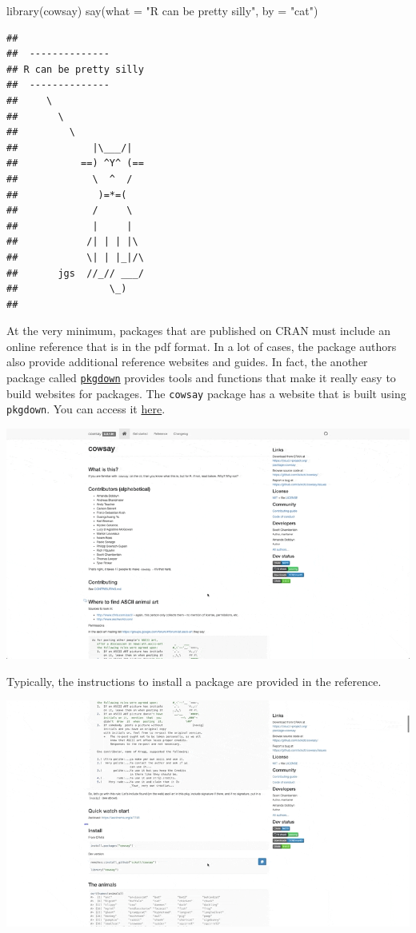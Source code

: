 \documentclass[
]{book}
\newenvironment{Shaded}{\begin{snugshade}}{\end{snugshade}}
\newcommand{\AttributeTok}[1]{\textcolor[rgb]{0.77,0.63,0.00}{#1}}
\newcommand{\FunctionTok}[1]{\textcolor[rgb]{0.00,0.00,0.00}{#1}}
\newcommand{\NormalTok}[1]{#1}
\newcommand{\StringTok}[1]{\textcolor[rgb]{0.31,0.60,0.02}{#1}}
\begin{document}
\begin{Shaded}
\begin{Highlighting}[]
\FunctionTok{library}\NormalTok{(cowsay)}
\FunctionTok{say}\NormalTok{(}\AttributeTok{what =} \StringTok{"R can be pretty silly"}\NormalTok{, }\AttributeTok{by =} \StringTok{"cat"}\NormalTok{)}
\end{Highlighting}
\end{Shaded}

\begin{verbatim}
## 
##  -------------- 
## R can be pretty silly 
##  --------------
##     \
##       \
##         \
##             |\___/|
##           ==) ^Y^ (==
##             \  ^  /
##              )=*=(
##             /     \
##             |     |
##            /| | | |\
##            \| | |_|/\
##       jgs  //_// ___/
##                \_)
## 
\end{verbatim}

At the very minimum, packages that are published on CRAN must include an online reference that is in the pdf format. In a lot of cases, the package authors also provide additional reference websites and guides. In fact, the another package called \href{https://pkgdown.r-lib.org/}{\texttt{pkgdown}} provides tools and functions that make it really easy to build websites for packages. The \texttt{cowsay} package has a website that is built using \texttt{pkgdown}. You can access it \href{https://sckott.github.io/cowsay/}{here}.

\includegraphics{assets/packages/gifs/cowsay_scroll.gif}

Typically, the instructions to install a package are provided in the reference.

\includegraphics{assets/packages/gifs/install_box.gif}
\end{document}
